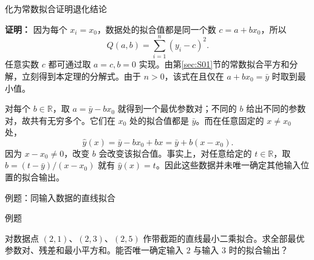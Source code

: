 \documentclass[aspectratio=169,10pt,fontset=fandol]{ctexbeamer}
\begin{document}
\begin{frame}[t,fragile]{化为常数拟合证明退化结论}
\footnotesize
{\footnotesize
\textbf{证明：}
因为每个 $x_i=x_0$，数据处的拟合值都是同一个数 $c=a+bx_0$，所以
\[
Q(a,b)=\sum_{i=1}^{n}(y_i-c)^2.
\]
任意实数 $c$ 都可通过取 $a=c,b=0$ 实现。由第\ref{sec:S01}节的常数拟合平方和分解，立刻得到本定理的分解式。由于 $n>0$，该式在且仅在 $a+bx_0=\bar{y}$ 时取到最小值。

对每个 $b\in\mathbb{R}$，取 $a=\bar{y}-bx_0$ 就得到一个最优参数对；不同的 $b$ 给出不同的参数对，故共有无穷多个。它们在 $x_0$ 处的拟合值都是 $\bar{y}$。而在任意固定的 $x\ne x_0$ 处，
\[
\hat{y}(x)=\bar{y}-bx_0+bx=\bar{y}+b(x-x_0).
\]
因为 $x-x_0\ne0$，改变 $b$ 会改变该拟合值。事实上，对任意给定的 $t\in\mathbb{R}$，取 $b=(t-\bar{y})/(x-x_0)$ 就有 $\hat{y}(x)=t$。因此这些数据并未唯一确定其他输入位置的拟合输出。

}
\end{frame}
\begin{frame}[t,fragile]{例题：同输入数据的直线拟合}
\normalsize
\begin{block}{例题}
{\normalsize
对数据点 $(2,1)$、$(2,3)$、$(2,5)$ 作带截距的直线最小二乘拟合。求全部最优参数对、残差和最小平方和。能否唯一确定输入 $2$ 与输入 $3$ 时的拟合输出？

}
\end{block}
\end{frame}
\end{document}
